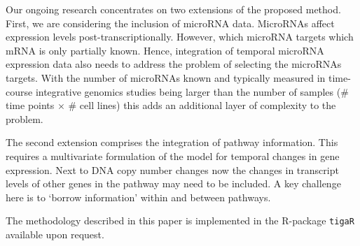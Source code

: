 Our ongoing research concentrates on two extensions of the proposed method. First, we are considering the inclusion of microRNA data. MicroRNAs affect expression levels post-transcriptionally. However, which microRNA targets which mRNA is only partially known. Hence, integration of temporal microRNA expression data also needs to address the problem of selecting the microRNAs targets. With the number of microRNAs known and typically measured in time-course integrative genomics studies being larger than the number of samples (\# time points $\times$ \# cell lines) this adds an additional layer of complexity to the problem.

The second extension comprises the integration of pathway information. This requires a multivariate formulation of the model for temporal changes in gene expression. Next to DNA copy number changes now the changes in transcript levels of other genes in the pathway may need to be included. A key challenge here is to `borrow information' within and between pathways.

The methodology described in this paper is implemented in the R-package {\tt tigaR} available upon request.

